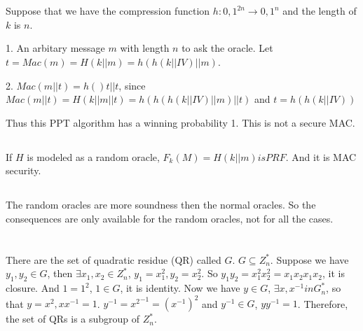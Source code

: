 \documentclass[onecolumn,oneside]{SUSTechHomework}
\begin{document}
  \section{}

    \subsection{}
    
    Suppose that we have the compression function $h: {0,1}^{2n} \rightarrow {0, 1}^n$ and the length of $k$ is $n$.
    
    1. An arbitary message $m$ with length $n$ to ask the oracle. Let $t = Mac(m) = H(k||m) = h(h(k||IV)||m)$.

    2. $Mac(m||t) = h()t||t$, since $Mac(m||t)=H(k||m||t) = h(h(h(k||IV)||m)||t)$ and $t = h(h(k||IV))$

    Thus this PPT algorithm has a winning probability 1.
    This is not a secure MAC.

    \subsection{}

    If $H$ is modeled as a random oracle, $F_k(M) =H(k||m) is PRF$.
    And it is MAC security.

    \subsection{}

    The random oracles are more soundness then the normal oracles.
    So the consequences are only available for the random oracles, not for all the cases.

\section{}

  \subsection{}
  
  There are the set of quadratic residue (QR) called $G$. $G \subseteq Z_n^*$.
  Suppose we have $y_1,y_2 \in G$, then $\exists x_1,x_2 \in Z_n^*$, $y_1 = x_1^2,y_2=x_2^2$.
  So $y_1y_2 = x_1^2x_2^2 = x_1x_2x_1x_2$, it is closure.
  And $1=1^2$, $1 \in G$, it is identity.
  Now we have $y \in G$, $\exists x,x^{-1} in G_n^*$, so that $y=x^2,xx^{-1}=1$.
  $y^{-1} = {x^2}^{-1} = (x^{-1})^2$ and $y^{-1} \in G$, $yy^{-1} = 1$.
  Therefore, the set of QRs is a subgroup of $Z_n^*$.
\end{document}
